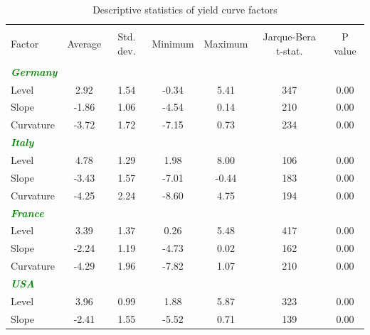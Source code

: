 \documentclass[12pt,bibliography=totoc]{article}
\begin{document}
\begin{table}[H]
\caption{Descriptive statistics of yield curve factors}%
\fontsize{10}{10}\selectfont
\centering %
\begin{tabular}{l c c c c c c}%
\hline\hline   \\ [-1.5ex]               %
Factor & Average & Std. dev. & Minimum & Maximum & Jarque-Bera t-stat.  & P value \\ [0.5ex] %

\hline       \\ [-1.5ex]           %


\textcolor{green}{\textit{\textbf{Germany}}}			&		&		&		&		&		&		\\
Level						&	 2.92 &	1.54	&	-0.34	&	5.41	&	347	&	0.00	\\
Slope				&	-1.86	&	1.06	&	-4.54	&	0.14	&	210	&	0.00	\\
													
Curvature					&	-3.72	&	1.72	&	-7.15	&	0.73	&	234	&	0.00	\\
\textcolor{green}{\textit{\textbf{Italy}}}		&		&		&		&		&		&		\\
Level						&	4.78	&	1.29	&	1.98	&	8.00	&	106	&	0.00	\\
Slope				&	-3.43	&	1.57	&	-7.01	&	-0.44	&	183	&	0.00	\\
													
Curvature					&	-4.25	&	2.24	&	-8.60	&	4.75	&	194	&	0.00	\\
\textcolor{green}{\textit{\textbf{France}}}			&		&		&		&		&		&		\\
Level						&	3.39	&	1.37	&	0.26	&	5.48	&	417	&	0.00	\\
Slope				&	-2.24	&	1.19	&	-4.73	&	0.02	&	162	&	0.00	\\
													
Curvature					&	-4.29	&	1.96	&	-7.82	&	1.07	&	210	&	0.00	\\
\textcolor{green}{\textit{\textbf{USA}}}			&		&		&		&		&		&		\\
Level						&	3.96	&	0.99	&	1.88	&	5.87	&	323	&	0.00	\\
Slope				&	-2.41	&	1.55	&	-5.52	&	0.71	&	139	&	0.00	\\
													

\end{tabular}
\end{table}
\end{document}
